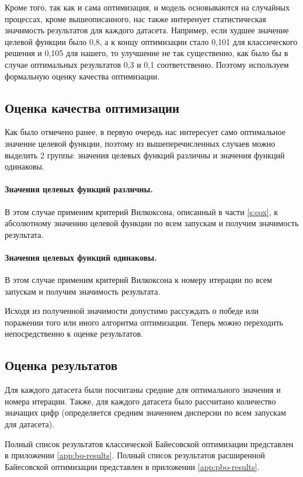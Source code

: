\documentclass[times,specification,annotation]{itmo-student-thesis}
\begin{document}
	Кроме того, так как и сама оптимизация, и модель основываются на случайных процессах, кроме вышеописанного, нас также интеренует статистическая значимость результатов для каждого датасета. Например, если худшее значение целевой функции было 0,8, а к концу оптимизации стало 0,101 для классического решения и 0,105 для нашего, то улучшение не так существенно, как было бы в случае оптимальных результатов 0,3 и 0,1 соответственно. Поэтому используем формальную оценку качества оптимизации.
	
	\subsection{Оценка качества оптимизации}
	Как было отмечено ранее, в первую очередь нас интересует само оптимальное значение целевой функции, поэтому из вышеперечисленных случаев можно выделить 2 группы: значения целевых функций различны и значения функций одинаковы. 
	\paragraph{Значения целевых функций различны.} В этом случае применим критерий Вилкоксона, описанный в части \ref{s:cox}, к абсолютному значению целевой функции по всем запускам и получим значимость результата.
	\paragraph{Значения целевых функций одинаковы.} В этом случае применим критерий Вилкоксона к номеру итерации по всем запускам и получим значимость результата. \par 
	
	Исходя из полученной значимости допустимо рассуждать о победе или поражении того или иного алгоритма оптимизации. Теперь можно переходить непосредственно к оценке результатов.
	
	\subsection{Оценка результатов}
	Для каждого датасета были посчитаны средние для оптимального значения и номера итерации. Также, для каждого датасета было рассчитано количество значащих цифр (определяется средним значением дисперсии по всем запускам для датасета). \par
	
	Полный список результатов классической Байесовской оптимизации представлен в приложении  \ref{app:bo-results}.
	Полный список результатов расширенной Байесовской оптимизации представлен в приложении \ref{app:pbo-results}.
	
\end{document}
